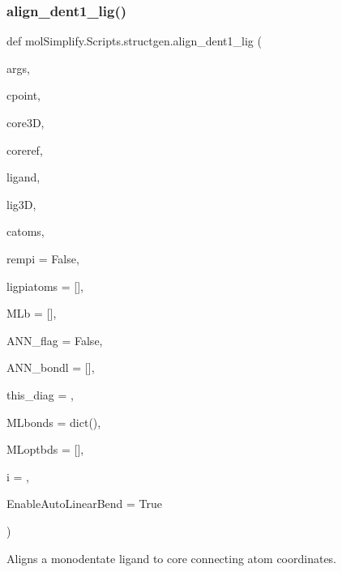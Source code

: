 \subsubsection{\texorpdfstring{align\+\_\+dent1\+\_\+lig()}{align\_dent1\_lig()}}
{\footnotesize\ttfamily def mol\+Simplify.\+Scripts.\+structgen.\+align\+\_\+dent1\+\_\+lig (\begin{DoxyParamCaption}\item[{}]{args,  }\item[{}]{cpoint,  }\item[{}]{core3D,  }\item[{}]{coreref,  }\item[{}]{ligand,  }\item[{}]{lig3D,  }\item[{}]{catoms,  }\item[{}]{rempi = {\ttfamily False},  }\item[{}]{ligpiatoms = {\ttfamily \mbox{[}\mbox{]}},  }\item[{}]{M\+Lb = {\ttfamily \mbox{[}\mbox{]}},  }\item[{}]{A\+N\+N\+\_\+flag = {\ttfamily False},  }\item[{}]{A\+N\+N\+\_\+bondl = {\ttfamily \mbox{[}\mbox{]}},  }\item[{}]{this\+\_\+diag = {},  }\item[{}]{M\+Lbonds = {\ttfamily dict()},  }\item[{}]{M\+Loptbds = {\ttfamily \mbox{[}\mbox{]}},  }\item[{}]{i = {},  }\item[{}]{Enable\+Auto\+Linear\+Bend = {\ttfamily True} }\end{DoxyParamCaption})}



Aligns a monodentate ligand to core connecting atom coordinates. 


